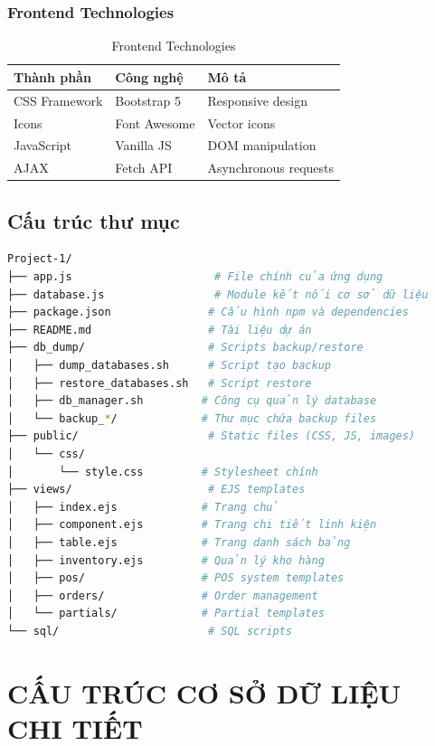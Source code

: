 \documentclass[12pt,a4paper]{article}
\begin{document}
\subsubsection{Frontend Technologies}
\begin{table}[H]
\centering
\begin{tabular}{@{}lll@{}}
\toprule
\textbf{Thành phần} & \textbf{Công nghệ} & \textbf{Mô tả} \\
\midrule
CSS Framework & Bootstrap 5 & Responsive design \\
Icons & Font Awesome & Vector icons \\
JavaScript & Vanilla JS & DOM manipulation \\
AJAX & Fetch API & Asynchronous requests \\
\bottomrule
\end{tabular}
\caption{Frontend Technologies}
\end{table}

\subsection{Cấu trúc thư mục}
\begin{lstlisting}[language=bash, caption=Cấu trúc thư mục dự án]
Project-1/
├── app.js                      # File chính của ứng dụng
├── database.js                 # Module kết nối cơ sở dữ liệu
├── package.json               # Cấu hình npm và dependencies
├── README.md                  # Tài liệu dự án
├── db_dump/                   # Scripts backup/restore
│   ├── dump_databases.sh      # Script tạo backup
│   ├── restore_databases.sh   # Script restore
│   ├── db_manager.sh         # Công cụ quản lý database
│   └── backup_*/             # Thư mục chứa backup files
├── public/                    # Static files (CSS, JS, images)
│   └── css/
│       └── style.css         # Stylesheet chính
├── views/                     # EJS templates
│   ├── index.ejs             # Trang chủ
│   ├── component.ejs         # Trang chi tiết linh kiện
│   ├── table.ejs             # Trang danh sách bảng
│   ├── inventory.ejs         # Quản lý kho hàng
│   ├── pos/                  # POS system templates
│   ├── orders/               # Order management
│   └── partials/             # Partial templates
└── sql/                       # SQL scripts
\end{lstlisting}

\section{CẤU TRÚC CƠ SỞ DỮ LIỆU CHI TIẾT}
\end{document}
